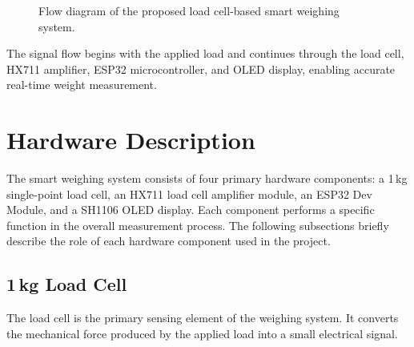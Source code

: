 
\begin{figure}[H]
\centering
{}%
\caption{Flow diagram of the proposed load cell-based smart weighing system.}
\label{fig:blockdiagram}
\end{figure}




The signal flow begins with the applied load and continues through the load cell, HX711 amplifier, ESP32 microcontroller, and OLED display, enabling accurate real-time weight measurement.

\section{Hardware Description}

The smart weighing system consists of four primary hardware components: a 1\,kg single-point load cell, an HX711 load cell amplifier module, an ESP32 Dev Module, and a SH1106 OLED display. Each component performs a specific function in the overall measurement process. The following subsections briefly describe the role of each hardware component used in the project.


\subsection{1\,kg Load Cell}

The load cell is the primary sensing element of the weighing system. It converts the mechanical force produced by the applied load into a small electrical signal.


